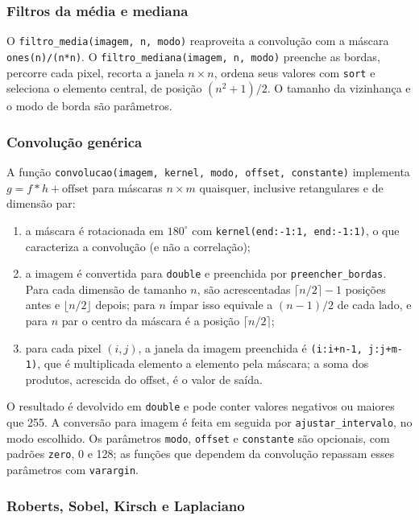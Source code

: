 \documentclass[11pt,a4paper]{article}
\begin{document}
\subsubsection{Filtros da média e mediana}

O \texttt{filtro\_media(imagem, n, modo)} reaproveita a convolução com a máscara \texttt{ones(n)/(n*n)}. O \texttt{filtro\_mediana(imagem, n, modo)} preenche as bordas, percorre cada pixel, recorta a janela $n\times n$, ordena seus valores com \texttt{sort} e seleciona o elemento central, de posição $(n^2+1)/2$. O tamanho da vizinhança e o modo de borda são parâmetros.

\subsubsection{Convolução genérica}

A função \texttt{convolucao(imagem, kernel, modo, offset, constante)} implementa $g = f*h + \text{offset}$ para máscaras $n\times m$ quaisquer, inclusive retangulares e de dimensão par:
\begin{enumerate}
  \item a máscara é rotacionada em $180^\circ$ com \texttt{kernel(end:-1:1, end:-1:1)}, o que caracteriza a convolução (e não a correlação);
  \item a imagem é convertida para \texttt{double} e preenchida por \texttt{preencher\_bordas}. Para cada dimensão de tamanho $n$, são acrescentadas $\lceil n/2\rceil - 1$ posições antes e $\lfloor n/2\rfloor$ depois; para $n$ ímpar isso equivale a $(n-1)/2$ de cada lado, e para $n$ par o centro da máscara é a posição $\lceil n/2\rceil$;
  \item para cada pixel $(i,j)$, a janela da imagem preenchida é \texttt{(i:i+n-1, j:j+m-1)}, que é multiplicada elemento a elemento pela máscara; a soma dos produtos, acrescida do offset, é o valor de saída.
\end{enumerate}
O resultado é devolvido em \texttt{double} e pode conter valores negativos ou maiores que 255. A conversão para imagem é feita em seguida por \texttt{ajustar\_intervalo}, no modo escolhido. Os parâmetros \texttt{modo}, \texttt{offset} e \texttt{constante} são opcionais, com padrões \texttt{zero}, 0 e 128; as funções que dependem da convolução repassam esses parâmetros com \texttt{varargin}.

\subsubsection{Roberts, Sobel, Kirsch e Laplaciano}
\end{document}
